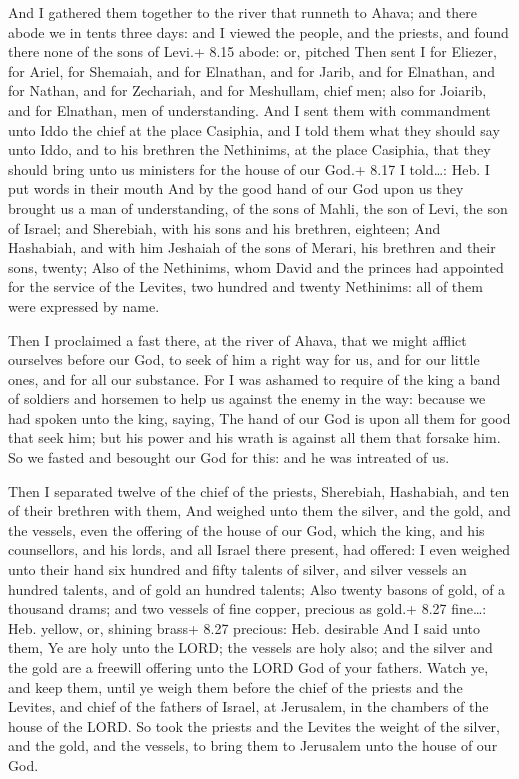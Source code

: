  And I gathered them together to the river that runneth
to Ahava; and there abode we in tents three days: and I viewed the
people, and the priests, and found there none of the sons of Levi.+ 8.15
abode: or, pitched  Then sent I for Eliezer, for Ariel, for
Shemaiah, and for Elnathan, and for Jarib, and for Elnathan, and for
Nathan, and for Zechariah, and for Meshullam, chief men; also for
Joiarib, and for Elnathan, men of understanding.  And I
sent them with commandment unto Iddo the chief at the place Casiphia,
and I told them what they should say unto Iddo, and to his brethren the
Nethinims, at the place Casiphia, that they should bring unto us
ministers for the house of our God.+ 8.17 I told\ldots: Heb. I put words
in their mouth  And by the good hand of our God upon us
they brought us a man of understanding, of the sons of Mahli, the son of
Levi, the son of Israel; and Sherebiah, with his sons and his brethren,
eighteen;  And Hashabiah, and with him Jeshaiah of the sons
of Merari, his brethren and their sons, twenty;  Also of
the Nethinims, whom David and the princes had appointed for the service
of the Levites, two hundred and twenty Nethinims: all of them were
expressed by name.

 Then I proclaimed a fast there, at the river of Ahava,
that we might afflict ourselves before our God, to seek of him a right
way for us, and for our little ones, and for all our substance.
 For I was ashamed to require of the king a band of
soldiers and horsemen to help us against the enemy in the way: because
we had spoken unto the king, saying, The hand of our God is upon all
them for good that seek him; but his power and his wrath is against all
them that forsake him.  So we fasted and besought our God
for this: and he was intreated of us.

 Then I separated twelve of the chief of the priests,
Sherebiah, Hashabiah, and ten of their brethren with them, 
And weighed unto them the silver, and the gold, and the vessels, even
the offering of the house of our God, which the king, and his
counsellors, and his lords, and all Israel there present, had offered:
 I even weighed unto their hand six hundred and fifty
talents of silver, and silver vessels an hundred talents, and of gold an
hundred talents;  Also twenty basons of gold, of a thousand
drams; and two vessels of fine copper, precious as gold.+ 8.27
fine\ldots: Heb. yellow, or, shining brass+ 8.27 precious: Heb.
desirable  And I said unto them, Ye are holy unto the LORD;
the vessels are holy also; and the silver and the gold are a freewill
offering unto the LORD God of your fathers.  Watch ye, and
keep them, until ye weigh them before the chief of the priests and the
Levites, and chief of the fathers of Israel, at Jerusalem, in the
chambers of the house of the LORD.  So took the priests and
the Levites the weight of the silver, and the gold, and the vessels, to
bring them to Jerusalem unto the house of our God.

